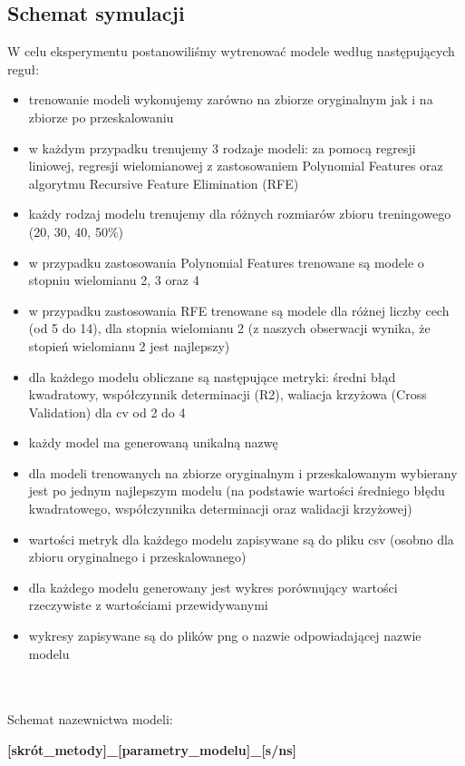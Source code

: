 \documentclass[11pt, a4paper, notitlepage]{report}
\begin{document}
\subsection{Schemat symulacji}
W celu eksperymentu postanowiliśmy wytrenować modele według następujących reguł:
\begin{itemize}
	\item trenowanie modeli wykonujemy zarówno na zbiorze oryginalnym jak i na zbiorze po przeskalowaniu
	\item w każdym przypadku trenujemy 3 rodzaje modeli: za pomocą regresji liniowej, regresji wielomianowej z zastosowaniem Polynomial Features oraz algorytmu Recursive Feature Elimination (RFE)
	\item każdy rodzaj modelu trenujemy dla różnych rozmiarów zbioru treningowego (20, 30, 40, 50\%)
	\item w przypadku zastosowania Polynomial Features trenowane są modele o stopniu wielomianu 2, 3 oraz 4
	\item w przypadku zastosowania RFE trenowane są modele dla różnej liczby cech (od 5 do 14), dla stopnia wielomianu 2 (z naszych obserwacji wynika, że stopień wielomianu 2 jest najlepszy)
	\item dla każdego modelu obliczane są następujące metryki: średni błąd kwadratowy, współczynnik determinacji (R2), waliacja krzyżowa (Cross Validation) dla cv od 2 do 4
	\item każdy model ma generowaną unikalną nazwę
	\item dla modeli trenowanych na zbiorze oryginalnym i przeskalowanym wybierany jest po jednym najlepszym modelu (na podstawie wartości średniego błędu kwadratowego, współczynnika determinacji oraz walidacji krzyżowej)
	\item wartości metryk dla każdego modelu zapisywane są do pliku csv (osobno dla zbioru oryginalnego i przeskalowanego)
	\item dla każdego modelu generowany jest wykres porównujący wartości rzeczywiste z wartościami przewidywanymi
	\item wykresy zapisywane są do plików png o nazwie odpowiadającej nazwie modelu
\end{itemize}
\\ \\
Schemat nazewnictwa modeli:
\begin{center}
\textbf{[skrót\_metody]\_[parametry\_modelu]\_[s/ns]}
\end{center}
\\ \\
\end{document}
